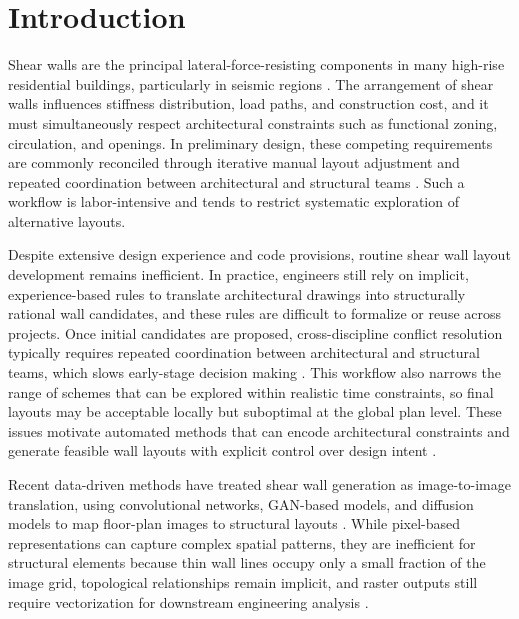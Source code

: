 \section{Introduction}
\label{sec:intro}

Shear walls are the principal lateral-force-resisting components in many high-rise residential buildings, particularly in seismic regions \cite{GB500112010Code2016,qianDesignTallBuilding2018}. The arrangement of shear walls influences stiffness distribution, load paths, and construction cost, and it must simultaneously respect architectural constraints such as functional zoning, circulation, and openings. In preliminary design, these competing requirements are commonly reconciled through iterative manual layout adjustment and repeated coordination between architectural and structural teams \cite{Steiner_2016}. Such a workflow is labor-intensive and tends to restrict systematic exploration of alternative layouts.

Despite extensive design experience and code provisions, routine shear wall layout development remains inefficient. In practice, engineers still rely on implicit, experience-based rules to translate architectural drawings into structurally rational wall candidates, and these rules are difficult to formalize or reuse across projects. Once initial candidates are proposed, cross-discipline conflict resolution typically requires repeated coordination between architectural and structural teams, which slows early-stage decision making \cite{heGenerativeAIBIMAutomatic2025}. This workflow also narrows the range of schemes that can be explored within realistic time constraints, so final layouts may be acceptable locally but suboptimal at the global plan level. These issues motivate automated methods that can encode architectural constraints and generate feasible wall layouts with explicit control over design intent \cite{liaoAutomatedStructuralDesign2021a}.

Recent data-driven methods have treated shear wall generation as image-to-image translation, using convolutional networks, GAN-based models, and diffusion models to map floor-plan images to structural layouts \cite{pizarroUseConvolutionalNetworks2021,zhouStructDiffusionEndendIntelligent2024}. While pixel-based representations can capture complex spatial patterns, they are inefficient for structural elements because thin wall lines occupy only a small fraction of the image grid, topological relationships remain implicit, and raster outputs still require vectorization for downstream engineering analysis \cite{wangHighResolutionImageSynthesis2018,feiIntegratedSchematicDesign2022}.

